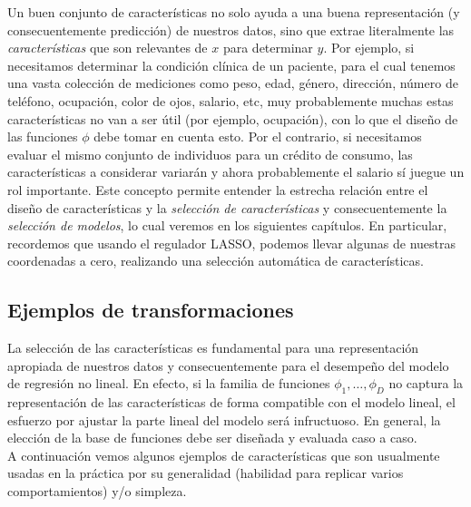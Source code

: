 \begin{mdframed}[style=discusion, frametitle={\center (S)elección de características}]

Un buen conjunto de características no solo ayuda a una buena representación (y consecuentemente predicción) de nuestros datos, sino que extrae literalmente las  \emph{características} que son relevantes de $x$ para determinar $y$. Por ejemplo, si necesitamos determinar la condición clínica de un  paciente, para el cual tenemos una vasta colección de  mediciones como peso, edad, género, dirección, número de teléfono, ocupación, color de ojos, salario, etc, muy probablemente muchas estas características no van a ser útil (por ejemplo, ocupación), con lo que el diseño de las funciones $\phi$ debe tomar en cuenta esto. Por el contrario, si necesitamos evaluar el mismo conjunto de individuos  para un crédito de consumo, las características a considerar variarán y ahora probablemente el salario sí juegue un rol importante. Este concepto permite entender la estrecha relación entre el diseño de características y la \emph{selección de características} y consecuentemente la \emph{selección de modelos}, lo cual veremos en los siguientes capítulos. En particular, recordemos que usando el regulador LASSO, podemos llevar algunas de nuestras coordenadas a cero, realizando una selección automática de características. 

\end{mdframed}




\subsection{Ejemplos de transformaciones}

La selección de las características es fundamental para una representación apropiada de nuestros datos y consecuentemente para el desempeño del modelo de regresión no lineal. En efecto, si la familia de funciones $\phi_1,\ldots,\phi_D$ no captura la representación de las características de forma compatible con el modelo lineal, el esfuerzo por ajustar la parte lineal del modelo será infructuoso. En general, la elección de la base de funciones debe ser diseñada y evaluada caso a caso.\\

A continuación vemos algunos ejemplos de características que son usualmente usadas en la práctica por su generalidad (habilidad para replicar varios comportamientos) y/o simpleza.\\

